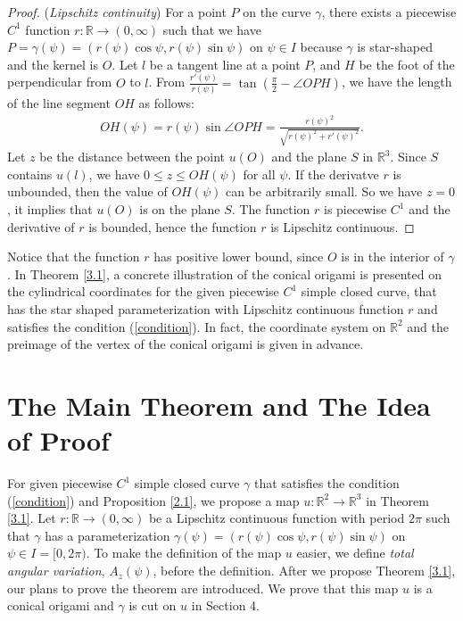 \documentclass{amsart}
\theoremstyle{plain}
\theoremstyle{definition}
\theoremstyle{remark}
\begin{document}
\begin{proof}
(\emph{Lipschitz continuity})
For a point $P$ on the curve $\gamma$, there exists a piecewise $C^1$ function $r:\mathbb{R}\to(0,\infty)$ such that we have $P=\gamma(\psi)=(r(\psi)\cos\psi,r(\psi)\sin\psi)$ on $\psi\in I$ because $\gamma$ is star-shaped and the kernel is $O$.
Let $l$ be a tangent line at a point $P$, and $H$ be the foot of the perpendicular from $O$ to $l$.
From $\frac{r'(\psi)}{r(\psi)}=\tan\left(\frac{\pi}2-\angle OPH\right)$, we have the length of the line segment $OH$ as follows:
\begin{align*}
OH(\psi)=r(\psi)\sin\angle OPH=\frac{r(\psi)^2}{\sqrt{r(\psi)^2+r'(\psi)^2}}.
\end{align*}
Let $z$ be the distance between the point $u(O)$ and the plane $S$ in $\mathbb{R}^3$.
Since $S$ contains $u(l)$, we have $0\le z\le OH(\psi)$ for all $\psi$.
If the derivatve $r$ is unbounded, then the value of $OH(\psi)$ can be arbitrarily small.
So we have $z=0$, it implies that $u(O)$ is on the plane $S$.
The function $r$ is piecewise $C^1$ and the derivative of $r$ is bounded, hence the function $r$ is Lipschitz continuous.
\end{proof}

Notice that the function $r$ has positive lower bound, since $O$ is in the interior of $\gamma$.
In Theorem \ref{3.1}, a concrete illustration of the conical origami is presented on the cylindrical coordinates for the given piecewise $C^1$ simple closed curve, that has the star shaped parameterization with Lipschitz continuous function $r$ and satisfies the condition (\ref{condition}).
In fact, the coordinate system on $\mathbb{R}^2$ and the preimage of the vertex of the conical origami is given in advance.









\bigskip



\section{The Main Theorem and The Idea of Proof}%

For given piecewise $C^1$ simple closed curve $\gamma$ that satisfies the condition (\ref{condition}) and Proposition \ref{2.1}, we propose a map $u:\mathbb{R}^2\to\mathbb{R}^3$ in Theorem \ref{3.1}.
Let $r:\mathbb{R}\to(0,\infty)$ be a Lipschitz continuous function with period $2\pi$ such that $\gamma$ has a parameterization $\gamma(\psi)=(r(\psi)\cos\psi,r(\psi)\sin\psi)$ on $\psi\in I=[0,2\pi)$.
To make the definition of the map $u$ easier, we define \emph{total angular variation}, $A_z(\psi)$, before the definition.
After we propose Theorem \ref{3.1}, our plans to prove the theorem are introduced.
We prove that this map $u$ is a conical origami and $\gamma$ is cut on $u$ in Section 4.
\end{document}
